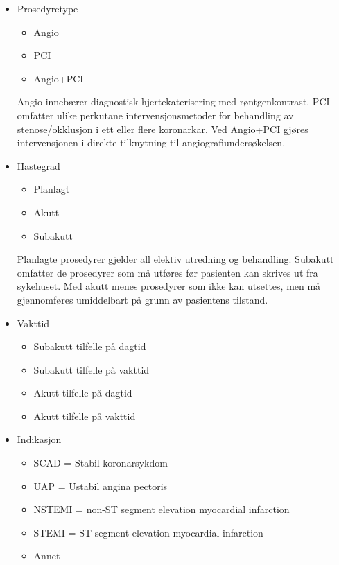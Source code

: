 \documentclass[norsk, a4paper]{report}
\begin{document}
\begin{itemize}
  \item{Prosedyretype}
    \begin{itemize}
      \item{Angio}
      \item{PCI}
      \item{Angio+PCI}
    \end{itemize}

Angio innebærer diagnostisk hjertekaterisering med røntgenkontrast. PCI omfatter ulike perkutane intervensjonsmetoder for behandling av stenose/okklusjon i ett eller flere koronarkar. Ved Angio+PCI gjøres intervensjonen i direkte tilknytning til angiografiundersøkelsen.

  \item{Hastegrad}
    \begin{itemize}
      \item{Planlagt}
      \item{Akutt}
      \item{Subakutt}
    \end{itemize}

Planlagte prosedyrer gjelder all elektiv utredning og behandling. Subakutt omfatter de prosedyrer som må utføres før pasienten kan skrives ut fra sykehuset. Med akutt menes prosedyrer som ikke kan utsettes, men må gjennomføres umiddelbart på grunn av pasientens tilstand.

  \item{Vakttid}
    \begin{itemize}
      \item{Subakutt tilfelle på dagtid}
      \item{Subakutt tilfelle på vakttid}
      \item{Akutt tilfelle på dagtid}
      \item{Akutt tilfelle på vakttid}
    \end{itemize}


  \item{Indikasjon}
    \begin{itemize}
      \item{SCAD = Stabil koronarsykdom}
      \item{UAP = Ustabil angina pectoris}
      \item{NSTEMI = non-ST segment elevation myocardial infarction}
      \item{STEMI = ST segment elevation myocardial infarction}
      \item{Annet}
    \end{itemize}



\end{itemize}
\end{document}
